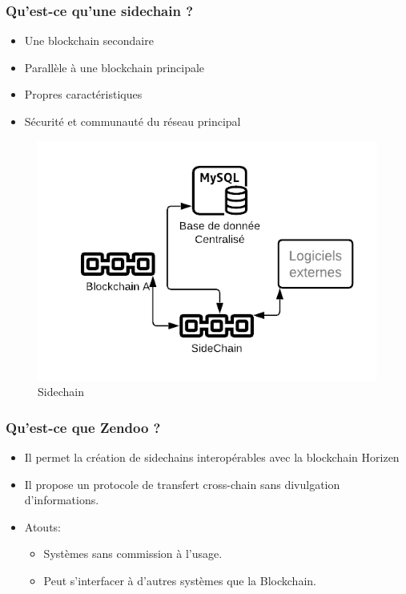 \begin{frame} 
  \frametitle{Qu’est-ce qu’une sidechain ?} 
  \begin{itemize} 
    \item Une blockchain secondaire 
    \item Parallèle à une blockchain principale 
    \item Propres caractéristiques 
    \item Sécurité et communauté du réseau principal 
  \end{itemize} 

  \begin{figure}
    \centering
    \includegraphics[scale = 0.4]{decentralisation/sidechain.png}
    \caption{Sidechain}
  \end{figure}
\end{frame}

\begin{frame} 
  \frametitle{Qu’est-ce que Zendoo ?} 
  \begin{itemize} 
    \item Il permet la création de sidechains interopérables avec la blockchain Horizen 
    \item Il propose un protocole de transfert cross-chain sans divulgation d'informations. 
    \item Atouts:
    \begin{itemize}
      \item Systèmes sans commission à l'usage.
      \item Peut s'interfacer à d'autres systèmes que la Blockchain.
    \end{itemize}
  \end{itemize} 
\end{frame}

